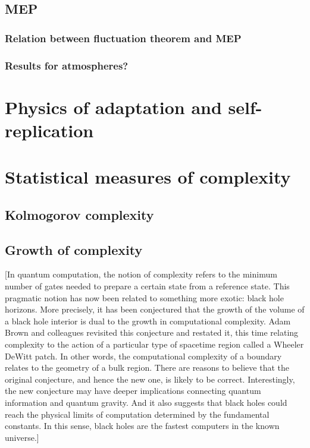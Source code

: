 \documentclass[a4paper,12pt,nofootinbib]{article}
\begin{document}
\subsection{MEP}
\subsubsection{Relation between fluctuation theorem and MEP}
\subsubsection{Results for atmospheres?}
\section{Physics of adaptation and self-replication}

\section{Statistical measures of complexity}
\subsection{Kolmogorov complexity}

\subsection{Growth of complexity}


[In quantum computation, the notion of complexity refers to the minimum number of gates needed to prepare a certain state from a reference state. This pragmatic notion has now been related to something more exotic: black hole horizons. More precisely, it has been conjectured that the growth of the volume of a black hole interior is dual to the growth in computational complexity. Adam Brown and colleagues revisited this conjecture and restated it, this time relating complexity to the action of a particular type of spacetime region called a Wheeler DeWitt patch. In other words, the computational complexity of a boundary relates to the geometry of a bulk region.
There are reasons to believe that the original conjecture, and hence the new one, is likely to be correct. Interestingly, the new conjecture may have deeper implications connecting quantum information and quantum gravity. And it also suggests that black holes could reach the physical limits of computation determined by the fundamental constants. In this sense, black holes are the fastest computers in the known universe.]



\end{document}
